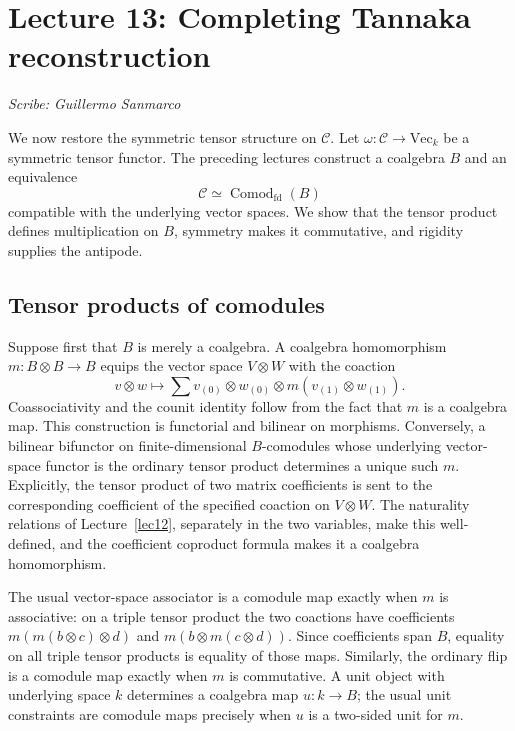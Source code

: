 \section{Lecture 13: Completing Tannaka reconstruction}\label{lec13}
\noindent\textit{Scribe: Guillermo Sanmarco}


We now restore the symmetric tensor structure on $\mathcal C$. Let $\omega:\mathcal C\to\mathrm{Vec}_k$ be a symmetric tensor functor. The preceding lectures construct a coalgebra $B$ and an equivalence
\[
 \mathcal C\simeq\operatorname{Comod}_{\mathrm{fd}}(B)
\]
compatible with the underlying vector spaces. We show that the tensor product defines multiplication on $B$, symmetry makes it commutative, and rigidity supplies the antipode.

\subsection*{Tensor products of comodules}
Suppose first that $B$ is merely a coalgebra. A coalgebra homomorphism $m:B\otimes B\to B$ equips the vector space $V\otimes W$ with the coaction
\[
 v\otimes w\longmapsto
 \sum v_{(0)}\otimes w_{(0)}\otimes m(v_{(1)}\otimes w_{(1)}).
\]
Coassociativity and the counit identity follow from the fact that $m$ is a coalgebra map. This construction is functorial and bilinear on morphisms. Conversely, a bilinear bifunctor on finite-dimensional $B$-comodules whose underlying vector-space functor is the ordinary tensor product determines a unique such $m$. Explicitly, the tensor product of two matrix coefficients is sent to the corresponding coefficient of the specified coaction on $V\otimes W$. The naturality relations of Lecture~\ref{lec12}, separately in the two variables, make this well-defined, and the coefficient coproduct formula makes it a coalgebra homomorphism.

The usual vector-space associator is a comodule map exactly when $m$ is associative: on a triple tensor product the two coactions have coefficients $m(m(b\otimes c)\otimes d)$ and $m(b\otimes m(c\otimes d))$. Since coefficients span $B$, equality on all triple tensor products is equality of those maps. Similarly, the ordinary flip is a comodule map exactly when $m$ is commutative. A unit object with underlying space $k$ determines a coalgebra map $u:k\to B$; the usual unit constraints are comodule maps precisely when $u$ is a two-sided unit for $m$.

